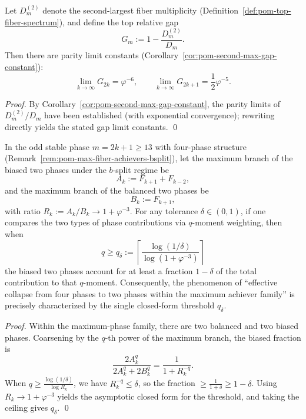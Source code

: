 \begin{corollary}\label{cor:pom-top-gap-limit-constants}
Let \(D_m^{(2)}\) denote the second-largest fiber multiplicity (Definition~\ref{def:pom-top-fiber-spectrum}), and define the top relative gap
\[
G_m:=1-\frac{D_m^{(2)}}{D_m}.
\]
Then there are parity limit constants (Corollary~\ref{cor:pom-second-max-gap-constant}):
\[
\boxed{\;
\lim_{k\to\infty}G_{2k}=\varphi^{-6},\qquad
\lim_{k\to\infty}G_{2k+1}=\frac{1}{2}\varphi^{-5}.\;}
\]
\end{corollary}

\begin{proof}
By Corollary~\ref{cor:pom-second-max-gap-constant}, the parity limits of \(D_m^{(2)}/D_m\) have been established (with exponential convergence); rewriting directly yields the stated gap limit constants. \qed
\end{proof}

\begin{proposition}\label{prop:pom-odd-fourphase-q-collapse-threshold}
In the odd stable phase \(m=2k+1\ge 13\) with four-phase structure (Remark~\ref{rem:pom-max-fiber-achievers-bsplit}), let the maximum branch of the biased two phases under the \(b\)-split regime be
\[
A_k:=F_{k+1}+F_{k-2},
\]
and the maximum branch of the balanced two phases be
\[
B_k:=F_{k+1},
\]
with ratio \(R_k:=A_k/B_k\to 1+\varphi^{-3}\).
For any tolerance \(\delta\in(0,1)\), if one compares the two types of phase contributions via \(q\)-moment weighting, then when
\[
\boxed{\;
q\ge q_\delta:=\left\lceil\frac{\log(1/\delta)}{\log(1+\varphi^{-3})}\right\rceil\;}
\]
the biased two phases account for at least a fraction \(1-\delta\) of the total contribution to that \(q\)-moment.
Consequently, the phenomenon of ``effective collapse from four phases to two phases within the maximum achiever family'' is precisely characterized by the single closed-form threshold \(q_\delta\).
\end{proposition}

\begin{proof}
Within the maximum-phase family, there are two balanced and two biased phases.
Coarsening by the \(q\)-th power of the maximum branch, the biased fraction is
\[
\frac{2A_k^q}{2A_k^q+2B_k^q}=\frac{1}{1+R_k^{-q}}.
\]
When \(q\ge \frac{\log(1/\delta)}{\log R_k}\), we have \(R_k^{-q}\le \delta\), so the fraction \(\ge \frac{1}{1+\delta}\ge 1-\delta\).
Using \(R_k\to 1+\varphi^{-3}\) yields the asymptotic closed form for the threshold, and taking the ceiling gives \(q_\delta\). \qed
\end{proof}

